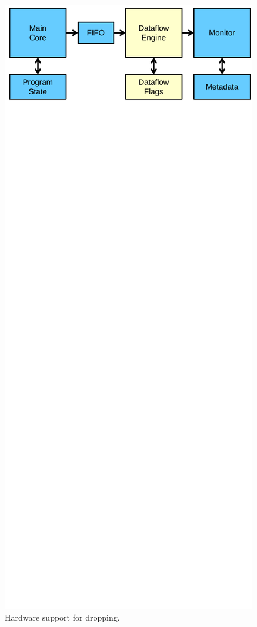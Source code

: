 \begin{figure}
  \begin{center}
    \vspace{-0.1in}
    \includegraphics[width=\columnwidth]{figs/dataflow_overview.pdf}
    \vspace{-0.2in}
    \caption{Hardware support for dropping.}
    \label{fig:dropping.dataflow_overview}
    \vspace{-0.2in}
  \end{center}
\end{figure}


